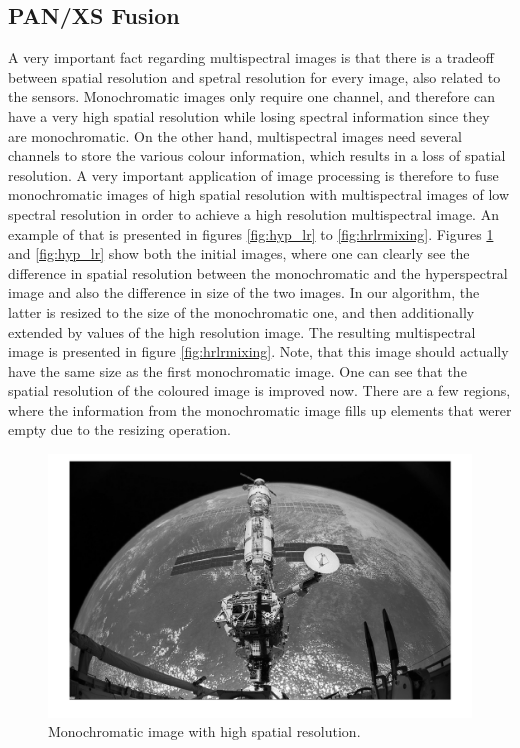 \subsection{PAN/XS Fusion}
A very important fact regarding multispectral images is that there is a tradeoff between spatial resolution and spetral resolution for every image, also related to the sensors. Monochromatic images only require one channel, and therefore can have a very high spatial resolution while losing spectral information since they are monochromatic. On the other hand, multispectral images need several channels to store the various colour information, which results in a loss of spatial resolution. A very important application of image processing is therefore to fuse monochromatic images of high spatial resolution with multispectral images of low spectral resolution in order to achieve a high resolution multispectral image. An example of that is presented in figures \ref{fig:hyp_lr} to \ref{fig:hrlrmixing}. Figures \ref{fig:Ipan_hr} and \ref{fig:hyp_lr} show both the initial images, where one can clearly see the difference in spatial resolution between the monochromatic and the hyperspectral image and also the difference in size of the two images. In our algorithm, the latter is resized to the size of the monochromatic one, and then additionally extended by values of the high resolution image. The resulting multispectral image is presented in figure \ref{fig:hrlrmixing}. Note, that this image should actually have the same size as the first monochromatic image. One can see that the spatial resolution of the coloured image is improved now. There are a few regions, where the information from the monochromatic image fills up elements that werer empty due to the resizing operation.

\begin{figure}[H]
	\centering
		\includegraphics[scale=0.5]{images/Ipan_hr.png}
		\caption{Monochromatic image with high spatial resolution.}
		\label{fig:Ipan_hr}
\end{figure}

